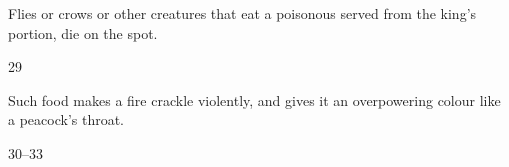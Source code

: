 \begin{translation}
\newcommand\animal[4]{\se{#2}{#1}} 
\let\bird=\animal 

Flies or crows or other creatures that eat 
a poisonous  served 
from the king's portion, die on the spot. 

\item [29] 

Such food makes a fire crackle violently, and gives it an overpowering colour like
a peacock's throat.

\item[30--33]



\end{translation}
